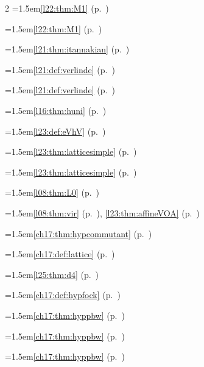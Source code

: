 \begin{multicols}{2}
\hangindent=1.5em\quad \ref{l22:thm:M1} (p.~\pageref{l22:thm:M1})\par
\hangindent=1.5em\quad \ref{l22:thm:M1} (p.~\pageref{l22:thm:M1})\par
\hangindent=1.5em\quad \ref{l21:thm:itannakian} (p.~\pageref{l21:thm:itannakian})\par
\hangindent=1.5em\quad \ref{l21:def:verlinde} (p.~\pageref{l21:def:verlinde})\par
\hangindent=1.5em\quad \ref{l21:def:verlinde} (p.~\pageref{l21:def:verlinde})\par
\hangindent=1.5em\quad \ref{l16:thm:huni} (p.~\pageref{l16:thm:huni})\par
\hangindent=1.5em\quad \ref{l23:def:eVhV} (p.~\pageref{l23:def:eVhV})\par
\hangindent=1.5em\quad \ref{l23:thm:latticesimple} (p.~\pageref{l23:thm:latticesimple})\par
\hangindent=1.5em\quad \ref{l23:thm:latticesimple} (p.~\pageref{l23:thm:latticesimple})\par
\hangindent=1.5em\quad \ref{l08:thm:L0} (p.~\pageref{l08:thm:L0})\par
\hangindent=1.5em\quad \ref{l08:thm:vir} (p.~\pageref{l08:thm:vir}), \ref{l23:thm:affineVOA} (p.~\pageref{l23:thm:affineVOA})\par
\hangindent=1.5em\quad \ref{ch17:thm:hypcommutant} (p.~\pageref{ch17:thm:hypcommutant})\par
\hangindent=1.5em\quad \ref{ch17:def:lattice} (p.~\pageref{ch17:def:lattice})\par
\hangindent=1.5em\quad \ref{l25:thm:d4} (p.~\pageref{l25:thm:d4})\par
\hangindent=1.5em\quad \ref{ch17:def:hypfock} (p.~\pageref{ch17:def:hypfock})\par
\hangindent=1.5em\quad \ref{ch17:thm:hyppbw} (p.~\pageref{ch17:thm:hyppbw})\par
\hangindent=1.5em\quad \ref{ch17:thm:hyppbw} (p.~\pageref{ch17:thm:hyppbw})\par
\hangindent=1.5em\quad \ref{ch17:thm:hyppbw} (p.~\pageref{ch17:thm:hyppbw})\par

\end{multicols}
